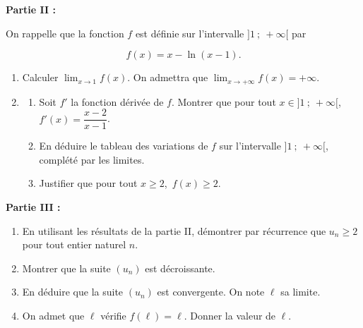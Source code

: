 \documentclass[10pt]{article}
\begin{document}
\bigskip

\textbf{Partie II :}

\medskip

On rappelle que la fonction $f$ est définie sur l'intervalle $]1~;~ +\infty[$ par 

\[f(x) = x - \ln (x - 1).\]

\medskip

\begin{enumerate}
\item Calculer $\displaystyle\lim_{x \to 1} f(x)$. On admettra que $\displaystyle\lim_{x \to + \infty} f(x) = + \infty$.
\item  
	\begin{enumerate}
		\item Soit $f'$ la fonction dérivée de $f$. Montrer que pour tout $x \in ]1~;~ +\infty[$,\,  $f'(x) = \dfrac{x - 2}{x - 1}$.
		\item En déduire le tableau des variations de $f$ sur l'intervalle $]1~;~ +\infty[$, complété par les limites.
		\item Justifier que pour tout $x
\geqslant  2$,\,  $f(x) \geqslant  2$.
	\end{enumerate}
\end{enumerate}

\bigskip

\textbf{Partie III :}

\medskip

\begin{enumerate}
\item En utilisant les résultats de la partie II, démontrer par récurrence que $u_n \geqslant  2$ pour tout entier naturel $n$.
\item Montrer que la suite $\left(u_n\right)$ est décroissante.
\item En déduire que la suite $\left(u_n\right)$ est convergente. On note $\ell$ sa limite.
\item On admet que $\ell$ vérifie $f(\ell) = \ell$. Donner la valeur de $\ell$.
\end{enumerate}
\end{document}
